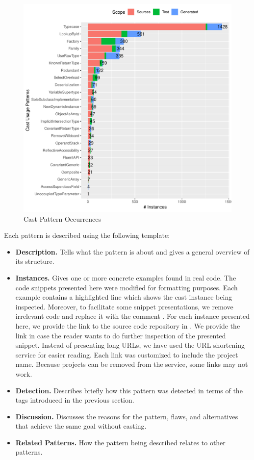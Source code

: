 \begin{figure}[ht!]
\centering
\includegraphics[width=\textwidth]{analysis/table-patterns.pdf}
\caption{Cast Pattern Occurrences} \label{fig:patterns}
\end{figure}

Each pattern is described using the following template:

\begin{itemize}
\item \textbf{Description.}
Tells what the pattern is about and gives a general overview of its structure.
\item \textbf{Instances.}
Gives one or more concrete examples found in real code.
The code snippets presented here were modified for formatting purposes.
Each example contains a highlighted line which shows the cast instance being inspected.
Moreover, to facilitate some snippet presentations,
we remove irrelevant code and replace it with the
comment \code{/* [...] */}.
For each instance presented here, we provide the link to the source code repository in \lgtm{}.
We provide the link in case the reader wants to do further inspection of the presented snippet.
Instead of presenting long \lgtm{} URLs, we have used the URL shortening service
\href{https://bitly.com/}{\bitly} for easier reading.
Each \bitly{} link was customized to include the project name.
Because projects can be removed from the \lgtm{} service,
some links may not work.
\item \textbf{Detection.}
Describes briefly how this pattern was detected in terms of the tags introduced in the previous section.
\item \textbf{Discussion.}
Discusses the reasons for the pattern, flaws, and alternatives that achieve the same goal without casting.
\item \textbf{Related Patterns.}
How the pattern being described relates to other patterns.
\end{itemize}

